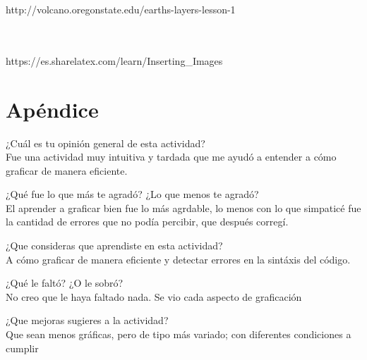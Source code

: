 \documentclass{article}
\begin{document}
http://volcano.oregonstate.edu/earths-layers-lesson-1

\\
\\

https://es.sharelatex.com/learn/Inserting_Images

\section{Apéndice}

\itemize

\item¿Cuál es tu opinión general de esta actividad?
\\
Fue una actividad muy intuitiva y tardada que me ayudó a entender a cómo graficar de manera eficiente.

\item¿Qué fue lo que más te agradó? ¿Lo que menos te agradó?
\\
El aprender a graficar bien fue lo más agrdable, lo menos con lo que simpaticé fue la cantidad de errores que no podía percibir, que después corregí.

\item¿Que consideras que aprendiste en esta actividad?
\\
A cómo graficar de manera eficiente y detectar errores en la sintáxis del código. 

\item¿Qué le faltó? ¿O le sobró?
\\
No creo que le haya faltado nada. Se vio cada aspecto de graficación

\item¿Que mejoras sugieres a la actividad?
\\
Que sean menos gráficas, pero de tipo más variado; con diferentes condiciones a cumplir

\enditemize
\end{document}
